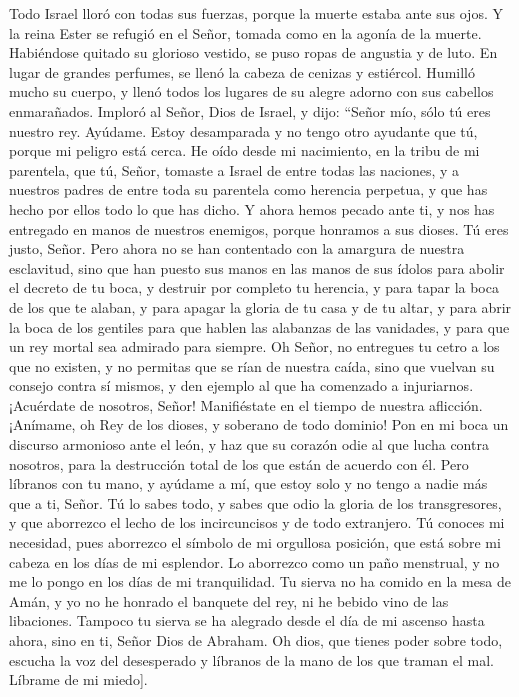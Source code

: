  Todo Israel lloró con todas sus fuerzas, porque la
muerte estaba ante sus ojos.  Y la reina Ester se refugió
en el Señor, tomada como en la agonía de la muerte. 
Habiéndose quitado su glorioso vestido, se puso ropas de angustia y de
luto. En lugar de grandes perfumes, se llenó la cabeza de cenizas y
estiércol. Humilló mucho su cuerpo, y llenó todos los lugares de su
alegre adorno con sus cabellos enmarañados.  Imploró al
Señor, Dios de Israel, y dijo: ``Señor mío, sólo tú eres nuestro rey.
Ayúdame. Estoy desamparada y no tengo otro ayudante que tú,
 porque mi peligro está cerca.  He oído
desde mi nacimiento, en la tribu de mi parentela, que tú, Señor, tomaste
a Israel de entre todas las naciones, y a nuestros padres de entre toda
su parentela como herencia perpetua, y que has hecho por ellos todo lo
que has dicho.  Y ahora hemos pecado ante ti, y nos has
entregado en manos de nuestros enemigos,  porque honramos
a sus dioses. Tú eres justo, Señor.  Pero ahora no se han
contentado con la amargura de nuestra esclavitud, sino que han puesto
sus manos en las manos de sus ídolos  para abolir el
decreto de tu boca, y destruir por completo tu herencia, y para tapar la
boca de los que te alaban, y para apagar la gloria de tu casa y de tu
altar,  y para abrir la boca de los gentiles para que
hablen las alabanzas de las vanidades, y para que un rey mortal sea
admirado para siempre.  Oh Señor, no entregues tu cetro a
los que no existen, y no permitas que se rían de nuestra caída, sino que
vuelvan su consejo contra sí mismos, y den ejemplo al que ha comenzado a
injuriarnos.  ¡Acuérdate de nosotros, Señor! Manifiéstate
en el tiempo de nuestra aflicción. ¡Anímame, oh Rey de los dioses, y
soberano de todo dominio!  Pon en mi boca un discurso
armonioso ante el león, y haz que su corazón odie al que lucha contra
nosotros, para la destrucción total de los que están de acuerdo con él.
 Pero líbranos con tu mano, y ayúdame a mí, que estoy
solo y no tengo a nadie más que a ti, Señor.  Tú lo sabes
todo, y sabes que odio la gloria de los transgresores, y que aborrezco
el lecho de los incircuncisos y de todo extranjero.  Tú
conoces mi necesidad, pues aborrezco el símbolo de mi orgullosa
posición, que está sobre mi cabeza en los días de mi esplendor. Lo
aborrezco como un paño menstrual, y no me lo pongo en los días de mi
tranquilidad.  Tu sierva no ha comido en la mesa de Amán,
y yo no he honrado el banquete del rey, ni he bebido vino de las
libaciones.  Tampoco tu sierva se ha alegrado desde el
día de mi ascenso hasta ahora, sino en ti, Señor Dios de Abraham.
 Oh dios, que tienes poder sobre todo, escucha la voz del
desesperado y líbranos de la mano de los que traman el mal. Líbrame de
mi miedo{]}.

